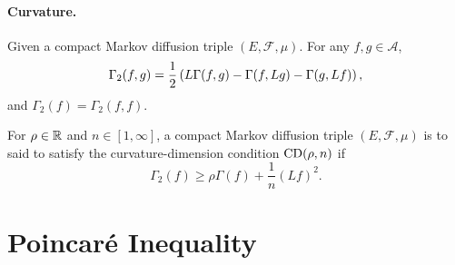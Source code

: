 \paragraph{Curvature.} 
\begin{defn}
   Given a compact Markov diffusion triple $(E,\mathcal{F},\mu)$. For any $f,g \in \mathcal{A}$,
   \begin{equation*}
    	\Gamma_2(f, g)=\frac{1}{2}\left(L \Gamma(f, g)-\Gamma(f, L g)-\Gamma(g, L f)\right),
    \end{equation*}
    and $\Gamma_2(f) = \Gamma_2(f, f)$.
\end{defn}

\begin{defn}
    For $\rho \in \mathbb{R}$ and $n \in [1,\infty]$, a compact Markov diffusion triple $(E,\mathcal{F},\mu)$ is to said to satisfy the curvature-dimension condition $\operatorname{CD}(\rho,n)$ if
    \begin{equation*}
    	\Gamma_2(f) \geq \rho \Gamma(f) + \frac{1}{n}(Lf)^2.
    \end{equation*}
\end{defn}

\section{Poincar\'e Inequality}

